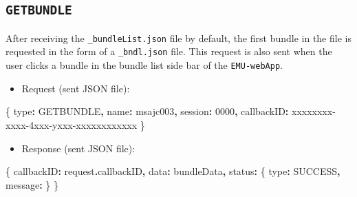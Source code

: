 \documentclass[
]{book}
\newenvironment{Shaded}{\begin{snugshade}}{\end{snugshade}}
\newcommand{\AttributeTok}[1]{\textcolor[rgb]{0.77,0.63,0.00}{#1}}
\newcommand{\NormalTok}[1]{#1}
\newcommand{\OperatorTok}[1]{\textcolor[rgb]{0.81,0.36,0.00}{\textbf{#1}}}
\newcommand{\StringTok}[1]{\textcolor[rgb]{0.31,0.60,0.02}{#1}}
\providecommand{\tightlist}{%
  \setlength{\itemsep}{0pt}\setlength{\parskip}{0pt}}
\begin{document}
\hypertarget{getbundle}{%
\subsection{\texorpdfstring{\texttt{GETBUNDLE}}{GETBUNDLE}}\label{getbundle}}

After receiving the \texttt{\_bundleList.json} file by default, the first bundle in the file is requested in the form of a \texttt{\_bndl.json} file. This request is also sent when the user clicks a bundle in the bundle list side bar of the \texttt{EMU-webApp}.

\begin{itemize}
\tightlist
\item
  Request (sent JSON file):
\end{itemize}

\begin{Shaded}
\begin{Highlighting}[]
\NormalTok{\{}
  \StringTok{\textquotesingle{}type\textquotesingle{}}\OperatorTok{:} \StringTok{\textquotesingle{}GETBUNDLE\textquotesingle{}}\OperatorTok{,}
  \StringTok{\textquotesingle{}name\textquotesingle{}}\OperatorTok{:} \StringTok{\textquotesingle{}msajc003\textquotesingle{}}\OperatorTok{,}
  \StringTok{\textquotesingle{}session\textquotesingle{}}\OperatorTok{:} \StringTok{\textquotesingle{}0000\textquotesingle{}}\OperatorTok{,}
  \StringTok{\textquotesingle{}callbackID\textquotesingle{}}\OperatorTok{:} \StringTok{\textquotesingle{}xxxxxxxx{-}xxxx{-}4xxx{-}yxxx{-}xxxxxxxxxxxx\textquotesingle{}}
\NormalTok{\}}
\end{Highlighting}
\end{Shaded}

\begin{itemize}
\tightlist
\item
  Response (sent JSON file):
\end{itemize}

\begin{Shaded}
\begin{Highlighting}[]
\NormalTok{\{}
  \StringTok{\textquotesingle{}callbackID\textquotesingle{}}\OperatorTok{:}\NormalTok{ request}\OperatorTok{.}\AttributeTok{callbackID}\OperatorTok{,}
  \StringTok{\textquotesingle{}data\textquotesingle{}}\OperatorTok{:}\NormalTok{ bundleData}\OperatorTok{,}
  \StringTok{\textquotesingle{}status\textquotesingle{}}\OperatorTok{:}\NormalTok{ \{}
    \StringTok{\textquotesingle{}type\textquotesingle{}}\OperatorTok{:} \StringTok{\textquotesingle{}SUCCESS\textquotesingle{}}\OperatorTok{,}
    \StringTok{\textquotesingle{}message\textquotesingle{}}\OperatorTok{:} \StringTok{\textquotesingle{}\textquotesingle{}}
\NormalTok{  \}}
\NormalTok{\}}
\end{Highlighting}
\end{Shaded}
\end{document}
